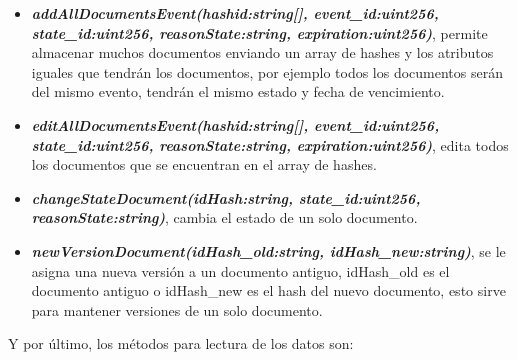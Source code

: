 \begin{itemize}
      \item \textit{\textbf{addAllDocumentsEvent(hashid:string[], event\_id:uint256, state\_id:uint256, reasonState:string, expiration:uint256)}}, permite almacenar muchos documentos enviando un array de hashes y 
      los atributos iguales que tendrán los documentos, por ejemplo todos los documentos serán del mismo evento, tendrán el mismo estado  y fecha de vencimiento.
      \item \textit{\textbf{editAllDocumentsEvent(hashid:string[], event\_id:uint256, state\_id:uint256, reasonState:string, expiration:uint256)}}, edita todos los documentos que se encuentran en el array de hashes.
      \item \textit{\textbf{changeStateDocument(idHash:string, state\_id:uint256, reasonState:string)}}, cambia el estado de un solo documento.
      \item \textit{\textbf{newVersionDocument(idHash\_old:string, idHash\_new:string)}}, se le asigna una nueva versión a un documento antiguo, idHash\_old es el documento antiguo o idHash\_new es el hash del nuevo documento,
      esto sirve para mantener versiones de un solo documento. 
    \end{itemize}

    Y por último, los métodos para lectura de los datos son:

